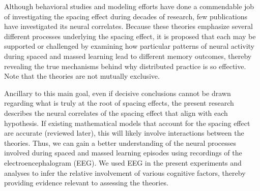 
Although behavioral studies and modeling efforts have done a commendable job of investigating the spacing effect during decades of research, few publications have investigated its neural correlates.  Because these theories emphasize several different processes underlying the spacing effect, it is proposed that each may be supported or challenged by examining how particular patterns of neural activity during spaced and massed learning lead to different memory outcomes, thereby revealing the true mechanisms behind why distributed practice is so effective.  Note that the theories are not mutually exclusive.

Ancillary to this main goal, even if decisive conclusions cannot be drawn regarding what is truly at the root of spacing effects, the present research describes the neural correlates of the spacing effect that align with each hypothesis.  If existing mathematical models that account for the spacing effect are accurate (reviewed later), this will likely involve interactions between the theories.  Thus, we can gain a better understanding of the neural processes involved during spaced and massed learning episodes using recordings of the electroencephalogram (EEG).  We used EEG in the present experiments and analyses to infer the relative involvement of various cognitive factors, thereby providing evidence relevant to assessing the theories.






